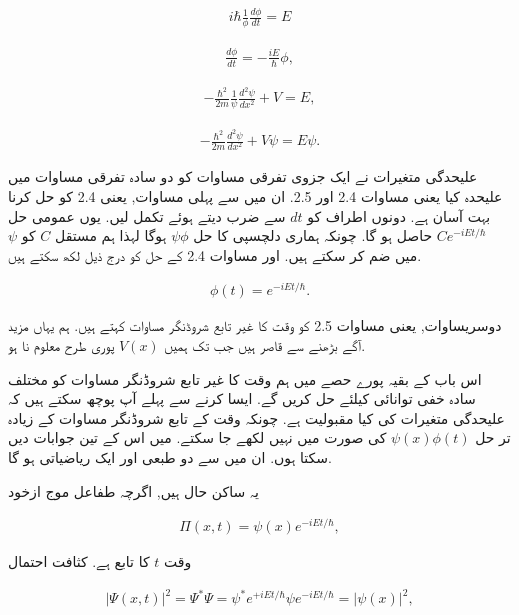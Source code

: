 \begin{align*}
i\hbar \frac{1}{\phi} \frac{d \phi}{d t} = E
\end{align*}

\begin{align}
\frac{d \phi }{d t} = - \frac{i E}{\hbar} \phi ,
\end{align}

\begin{align*}
- \frac{\hbar^{2}}{2m} \frac{1}{\psi} \frac{d^{2} \psi}{d x^{2}} + V = E,
\end{align*}

\begin{align}
- \frac{\hbar^{2}}{2m} \frac{d^{2} \psi}{dx^{2}} +V\psi = E\psi.
\end{align}

علیحدگی متغیرات نے ایک جزوی تفرقی مساوات کو دو سادہ تفرقی مساوات میں علیحدہ کیا یعنی مساوات 2.4 اور 2.5. ان میں سے پہلی مساوات, یعنی 2.4 کو حل کرنا بہت آسان ہے. دونوں اطراف کو \( dt \) سے ضرب دیتے ہوئے تکمل لیں. یوں عمومی حل \( C e^{-iEt/\hbar} \) حاصل ہو گا. چونکہ ہماری دلچسپی کا حل \( \psi\phi \) ہوگا لہذا ہم مستقل \( C \) کو \( \psi \)  میں ضم کر سکتے ہیں. اور مساوات 2.4 کے حل کو درج ذیل لکھ سکتے ہیں. 

\begin{align}
\phi(t) = e^{-iEt/\hbar}.
\end{align}


دوسریساوات, یعنی مساوات 2.5  کو وقت کا غیر تابع شروڈنگر مساوات کہتے ہیں. ہم یہاں مزید آگے بڑھنے سے قاصر ہیں جب تک ہمیں \( V(x) \) پوری طرح معلوم نا ہو. 

اس باب کے بقیہ پورے حصے میں ہم وقت کا غیر تابع شروڈنگر مساوات کو مختلف سادہ خفی توانائی کیلئے حل کریں گے. ایسا کرنے سے پہلے آپ پوچھ سکتے ہیں کہ علیحدگی متغیرات کی کیا مقبولیت ہے. چونکہ وقت کے تابع شروڈنگر مساوات کے زیادہ تر حل \( \psi (x) \phi (t) \)  کی صورت میں نہیں لکھے جا سکتے. میں اس کے تین جوابات دیں سکتا ہوں. ان میں سے دو طبعی اور ایک ریاضیاتی ہو گا. 

یہ ساکن حال ہیں, اگرچہ طفاعل موج ازخود 

\begin{align}
\Pi (x,t) = \psi (x) e^{-iEt/\hbar},
\end{align}

وقت \( t \) کا تابع ہے. کثافت احتمال 

\begin{align}
\left| \Psi (x,t) \right|^{2} = \Psi^{*}\Psi = \psi^{*}e^{+iEt/\hbar} \psi e^{-iEt/\hbar} = \left| \psi (x) \right|^{2},
\end{align}


